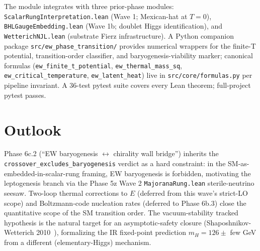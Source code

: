 \documentclass[aps,prd,twocolumn,showpacs,superscriptaddress,nofootinbib]{revtex4-2}
\newcommand{\CubicCoeff}{E}
\begin{document}
The module integrates with three prior-phase modules:
\texttt{ScalarRungInterpretation.lean} (Wave 1; Mexican-hat at $T = 0$),
\texttt{BHLGaugeEmbedding.lean} (Wave 1b; doublet Higgs identification),
and \texttt{WetterichNJL.lean} (substrate Fierz infrastructure).
A Python companion package \texttt{src/ew\_phase\_transition/} provides
numerical wrappers for the finite-T potential, transition-order
classifier, and baryogenesis-viability marker; canonical formulas
(\texttt{ew\_finite\_t\_potential}, \texttt{ew\_thermal\_mass\_sq},
\texttt{ew\_critical\_temperature}, \texttt{ew\_latent\_heat}) live in
\texttt{src/core/formulas.py} per pipeline invariant. A 36-test pytest
suite covers every Lean theorem; full-project pytest passes.

\section{Outlook}
\label{sec:outlook}

Phase 6c.2 (``EW baryogenesis $\leftrightarrow$ chirality wall bridge'')
inherits the
\texttt{crossover\_excludes\_baryogenesis} verdict as a hard
constraint: in the SM-as-embedded-in-scalar-rung framing, EW
baryogenesis is forbidden, motivating the leptogenesis branch via
the Phase 5z Wave 2 \texttt{MajoranaRung.lean} sterile-neutrino seesaw.
Two-loop thermal corrections to $\CubicCoeff$ (deferred from this
wave's strict-LO scope) and Boltzmann-code nucleation rates (deferred
to Phase 6b.3) close the quantitative scope of the SM transition
order. The vacuum-stability tracked hypothesis is the natural target
for an asymptotic-safety closure (Shaposhnikov-Wetterich
2010~\cite{ShaposhnikovWetterich2010}), formalizing the IR fixed-point
prediction $m_H = 126 \pm $ few GeV from a different (elementary-Higgs)
mechanism.
\end{document}
